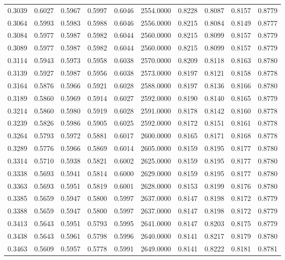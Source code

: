 \begin{tabular}{rrrrrrrrrr}
0.3039 & 0.6027 & 0.5967 & 0.5997 & 0.6046 & 2554.0000 & 0.8228 & 0.8087 & 0.8157 & 0.8779 \\
0.3064 & 0.5993 & 0.5983 & 0.5988 & 0.6046 & 2556.0000 & 0.8215 & 0.8084 & 0.8149 & 0.8777 \\
0.3084 & 0.5977 & 0.5987 & 0.5982 & 0.6044 & 2560.0000 & 0.8215 & 0.8099 & 0.8157 & 0.8779 \\
0.3089 & 0.5977 & 0.5987 & 0.5982 & 0.6044 & 2560.0000 & 0.8215 & 0.8099 & 0.8157 & 0.8779 \\
0.3114 & 0.5943 & 0.5973 & 0.5958 & 0.6038 & 2570.0000 & 0.8209 & 0.8118 & 0.8163 & 0.8780 \\
0.3139 & 0.5927 & 0.5987 & 0.5956 & 0.6038 & 2573.0000 & 0.8197 & 0.8121 & 0.8158 & 0.8778 \\
0.3164 & 0.5876 & 0.5966 & 0.5921 & 0.6028 & 2588.0000 & 0.8197 & 0.8136 & 0.8166 & 0.8780 \\
0.3189 & 0.5860 & 0.5969 & 0.5914 & 0.6027 & 2592.0000 & 0.8190 & 0.8140 & 0.8165 & 0.8779 \\
0.3214 & 0.5860 & 0.5980 & 0.5919 & 0.6028 & 2591.0000 & 0.8178 & 0.8142 & 0.8160 & 0.8778 \\
0.3239 & 0.5826 & 0.5986 & 0.5905 & 0.6025 & 2592.0000 & 0.8172 & 0.8151 & 0.8161 & 0.8778 \\
0.3264 & 0.5793 & 0.5972 & 0.5881 & 0.6017 & 2600.0000 & 0.8165 & 0.8171 & 0.8168 & 0.8778 \\
0.3289 & 0.5776 & 0.5966 & 0.5869 & 0.6014 & 2605.0000 & 0.8159 & 0.8195 & 0.8177 & 0.8780 \\
0.3314 & 0.5710 & 0.5938 & 0.5821 & 0.6002 & 2625.0000 & 0.8159 & 0.8195 & 0.8177 & 0.8780 \\
0.3338 & 0.5693 & 0.5941 & 0.5814 & 0.6000 & 2629.0000 & 0.8159 & 0.8195 & 0.8177 & 0.8780 \\
0.3363 & 0.5693 & 0.5951 & 0.5819 & 0.6001 & 2628.0000 & 0.8153 & 0.8199 & 0.8176 & 0.8780 \\
0.3385 & 0.5659 & 0.5947 & 0.5800 & 0.5997 & 2637.0000 & 0.8147 & 0.8198 & 0.8172 & 0.8779 \\
0.3388 & 0.5659 & 0.5947 & 0.5800 & 0.5997 & 2637.0000 & 0.8147 & 0.8198 & 0.8172 & 0.8779 \\
0.3413 & 0.5643 & 0.5951 & 0.5793 & 0.5995 & 2641.0000 & 0.8147 & 0.8203 & 0.8175 & 0.8779 \\
0.3438 & 0.5643 & 0.5961 & 0.5798 & 0.5996 & 2640.0000 & 0.8141 & 0.8217 & 0.8179 & 0.8780 \\
0.3463 & 0.5609 & 0.5957 & 0.5778 & 0.5991 & 2649.0000 & 0.8141 & 0.8222 & 0.8181 & 0.8781 \\

\end{tabular}
